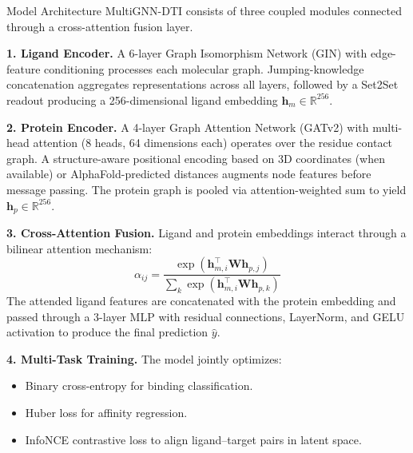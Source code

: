 \documentclass[20pt,landscape]{extarticle}
\begin{document}
\begin{minipage}[t]{0.325\textwidth}
\RaggedRight

\begin{posterblockcoral}{Model Architecture}
MultiGNN-DTI consists of three coupled modules connected through a cross-attention fusion layer.

\vspace{4pt}
\textbf{1. Ligand Encoder.} A 6-layer Graph Isomorphism Network (GIN) with edge-feature conditioning
processes each molecular graph. Jumping-knowledge concatenation aggregates representations across all layers,
followed by a Set2Set readout producing a 256-dimensional ligand embedding $\mathbf{h}_m \in \mathbb{R}^{256}$.

\textbf{2. Protein Encoder.} A 4-layer Graph Attention Network (GATv2) with multi-head attention (8 heads,
64 dimensions each) operates over the residue contact graph. A structure-aware positional encoding based on
3D coordinates (when available) or AlphaFold-predicted distances augments node features before message passing.
The protein graph is pooled via attention-weighted sum to yield $\mathbf{h}_p \in \mathbb{R}^{256}$.

\textbf{3. Cross-Attention Fusion.} Ligand and protein embeddings interact through a bilinear attention
mechanism:
\[
\alpha_{ij} = \frac{\exp(\mathbf{h}_{m,i}^\top \mathbf{W} \mathbf{h}_{p,j})}
                  {\sum_{k} \exp(\mathbf{h}_{m,i}^\top \mathbf{W} \mathbf{h}_{p,k})}
\]
The attended ligand features are concatenated with the protein embedding and passed through a 3-layer MLP
with residual connections, LayerNorm, and GELU activation to produce the final prediction $\hat{y}$.

\textbf{4. Multi-Task Training.} The model jointly optimizes:
\begin{itemize}
  \item Binary cross-entropy for binding classification.
  \item Huber loss for affinity regression.
  \item InfoNCE contrastive loss to align ligand--target pairs in latent space.
\end{itemize}
\end{posterblockcoral}


\end{minipage}
\end{document}
